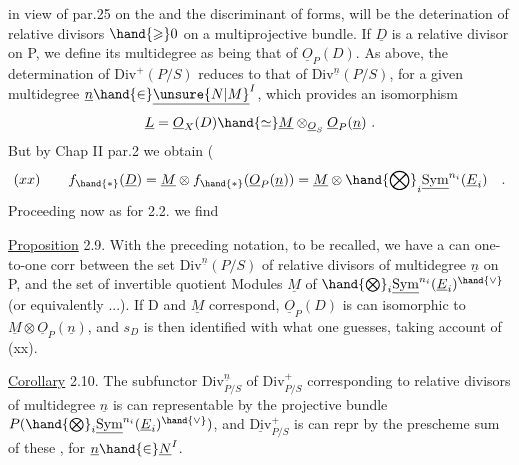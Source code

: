 
in view of par.25 on the  and the discriminant of forms, will be the
deterination of relative divisors $\hand{\geqslant} 0$ on a multiprojective bundle.
If $\underline{D}$ is a relative divisor on P, we define its multidegree as being
that of $\underline{O}_P(D)$. As above, the determination of $\mathrm{Div}^{+}(P/S)$ reduces
to that of $\mathrm{Div}^{\underline{n}}(P/S)$, for a given multidegree $\underline{n}\hand{\in}\underline{\unsure{N|M}}^{I}$, which provides an
isomorphism
\[ \underline{L} =\underline{O}_X(D) \hand{\simeq} \underline{M} \otimes_{\underline{O}_S} \underline{O}_P(\underline{n}) \ . \]
But by Chap II par.2 we obtain (
\[ (xx) \qquad f_{\hand{*}}(\underline{D}) = \underline{M} \otimes f_{\hand{*}}(\underline{O}_P(\underline{n})) = \underline{M} \otimes \hand{\bigotimes}_i \underline{\mathrm{Sym}}^{n_i}(\underline{E}_i) \quad . \]
Proceeding now as for 2.2. we find

\uline{Proposition} 2.9. With the preceding notation, to be recalled, we have a
can one-to-one corr between the set $\mathrm{Div}^{\underline{n}}(P/S)$ of relative divisors of
multidegree $\underline{n}$ on P, and the set of invertible quotient Modules $\underline{M}$
of $\hand{\bigotimes}_i \underline{\mathrm{Sym}}^{n_i}(\underline{E}_i)^{\hand{\vee}}$ (or equivalently ...). If D and $\underline{M}$ correspond,
$\underline{O}_P(D)$ is can isomorphic to $\underline{M}\otimes\underline{O}_P(\underline{n})$, and $s_D$ is then identified
with what one guesses, taking account of (xx).

\uline{Corollary} 2.10. The subfunctor $\mathrm{Div}^{\underline{n}}_{P/S}$ of $\mathrm{Div}^{+}_{P/S}$ corresponding to
relative divisors of multidegree $\underline{n}$ is can representable by the projective
bundle $P(\hand{\bigotimes}_i \underline{\mathrm{Sym}}^{n_i}(\underline{E}_i)^{\hand{\vee}})$, and $\underline{\mathrm{Div}}^{+}_{P/S}$ is can repr by the prescheme
sum of these , for $\underline{n}\hand{\in}\underline{N}^{I}$.

